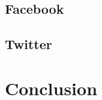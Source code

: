 \documentclass[a4paper,10pt]{article}
\begin{document}
\subsection{Facebook}
\subsection{Twitter}

\section{Conclusion}


\clearpage
\end{document}
